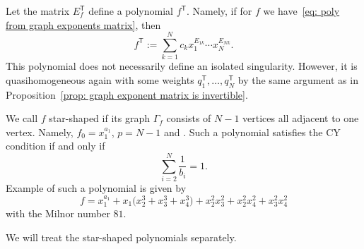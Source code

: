 \documentclass[10pt,a4paper]{article}
\numberwithin{equation}{section}
\begin{document}
Let the matrix $E_f^{\mathsf{T}}$ define a polynomial $f^{\mathsf{T}}$. Namely, if for $f$ we have~\eqref{eq: poly from graph exponents matrix}, then
\[
	f^{\mathsf{T}} := \sum_{k=1}^N c_k x_1^{E_{1k}} \cdots x_N^{E_{Nk}}.
\]
This polynomial does not necessarily define an isolated singularity. However, it is quasihomogeneous again with some weights $q_1^{\mathsf{T}}, \dots, q_N^{\mathsf{T}}$ by the same argument as in Proposition~\ref{prop: graph exponent matrix is invertible}.

We call $f$ star-shaped if its graph $\Gamma_f$ consists of $N-1$ vertices all adjacent to one vertex. Namely, $f_0 = x_1^{a_1}$, $p=N-1$ and . Such a polynomial satisfies the CY condition if and only if
\[
 \sum_{i=2}^N \frac{1}{b_i} = 1.
\]
Example of such a polynomial is given by
\[
 f = x_1^{a_1} + x_1 \bigl(x_2^3 +x_3^3 +x_4^3\bigr) + x_2^2x_3^2+ x_2^2x_4^2+ x_3^2x_4^2
\]
with the Milnor number $81$.

We will treat the star-shaped polynomials separately.
\end{document}
